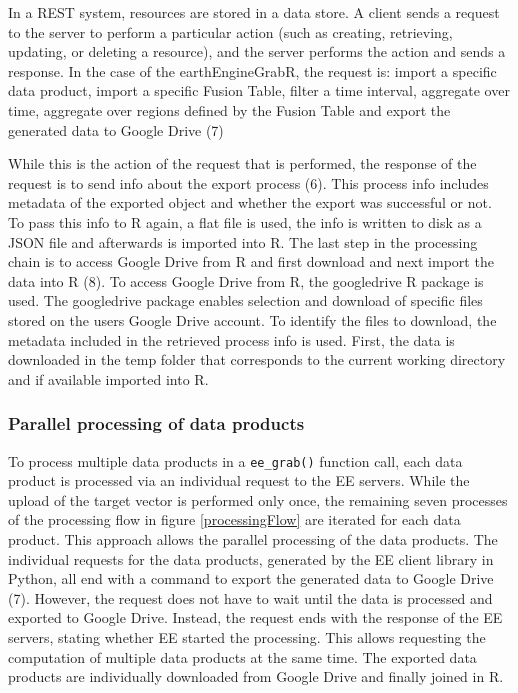 In a REST system, resources are stored in a data store. A client sends a request to the server to perform a particular action (such as creating, retrieving, updating, or deleting a resource), and the server performs the action and sends a response. In the case of the earthEngineGrabR, the request is: import a specific data product, import a specific Fusion Table, filter a time interval, aggregate over time, aggregate over regions defined by the Fusion Table and export the generated data to Google Drive (7)

While this is the action of the request that is performed, the response of the request is to send info about the export process (6). This process info includes metadata of the exported object and whether the export was successful or not. To pass this info to R again, a flat file is used, the info is written to disk as a JSON file and afterwards is imported into R. The last step in the processing chain is to access Google Drive from R and first download and next import the data into R (8). To access Google Drive from R, the googledrive R package is used. The googledrive package enables selection and download of specific files stored on the users Google Drive account. To identify the files to download, the metadata included in the retrieved process info is used. First, the data is downloaded in the temp folder that corresponds to the current working directory and if available imported into R.

\subsubsection{Parallel processing of data products}


To process multiple data products in a \texttt{ee\_grab()} function call, each data product is processed via an individual request to the EE servers. While the upload of the target vector is performed only once, the remaining seven processes of the processing flow in figure \ref{processingFlow} are iterated for each data product. This approach allows the parallel processing of the data products. The individual requests for the data products, generated by the EE client library in Python, all end with a command to export the generated data to Google Drive (7). However, the request does not have to wait until the data is processed and exported to Google Drive. Instead, the request ends with the response of the EE servers, stating whether EE started the processing. 
This allows requesting the computation of multiple data products at the same time. The exported data products are individually downloaded from Google Drive and finally joined in R.


